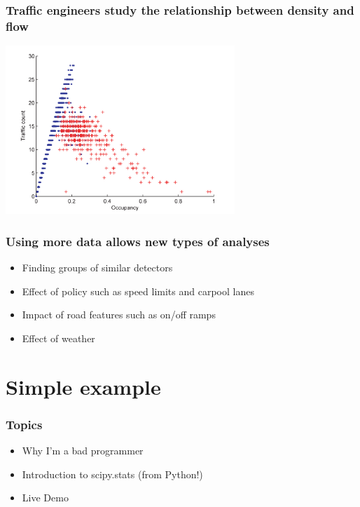 \documentclass{beamer}
\begin{document}
\begin{frame}

    \frametitle{Traffic engineers study the relationship between 
    density and flow \cite{li2011fundamental}}

\centerline{\includegraphics[height=2.5in]{fundamental_diagram.png}}

\end{frame}
\begin{frame}

    \frametitle{Using more data allows new types of analyses}

    \begin{itemize}
        \item Finding groups of similar detectors
        \item Effect of policy such as speed limits and carpool lanes
        \item Impact of road features such as on/off ramps
        \item Effect of weather
    \end{itemize}

\end{frame}
\section{Simple example}
\begin{frame}


\frametitle{Topics}

\begin{itemize}

    \item Why I'm a bad programmer
    \item Introduction to scipy.stats (from Python!)
    \item Live Demo

\end{itemize}

\end{frame}
\end{document}
